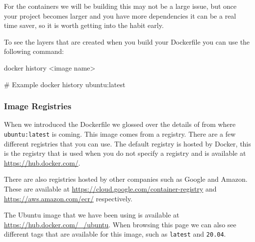 \documentclass{csse4400}
\begin{document}
For the containers we will be building this may not be a large issue,
but once your project becomes larger and you have more dependencies it can be a real time saver,
so it is worth getting into the habit early.

To see the layers that are created when you build your Dockerfile you can use the following command:

\begin{code}[language=bash,numbers=none]{}
docker history <image name>

# Example
docker history ubuntu:latest
\end{code}


\subsubsection{Image Registries}

When we introduced the Dockerfile we glossed over the details of from where \texttt{ubuntu:latest} is coming.
This image comes from a registry.
There are a few different registries that you can use.
The default registry is hosted by Docker,
this is the registry that is used when you do not specify a registry and is available at \url{https://hub.docker.com/}.

There are also registries hosted by other companies such as Google and Amazon.
These are available at \url{https://cloud.google.com/container-registry} and \url{https://aws.amazon.com/ecr/} respectively.

The Ubuntu image that we have been using is available at \url{https://hub.docker.com/_/ubuntu}.
When browsing this page we can also see different tags that are available for this image,
such as \texttt{latest} and \texttt{20.04}.
\end{document}
